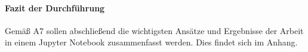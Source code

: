 \begin{otherlanguage}{ngerman}
















\paragraph{Fazit der Durchführung} 

Gemäß A7 sollen abschließend die wichtigsten Ansätze und Ergebnisse der Arbeit in einem Jupyter Notebook zusammenfasst werden. Dies findet sich im Anhang. 



\end{otherlanguage}
